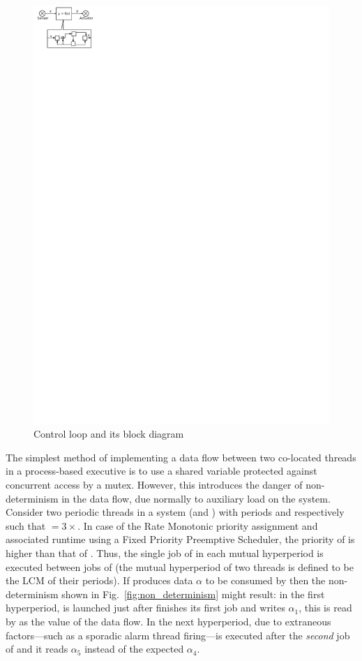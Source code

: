 \begin{figure}
\centering
\includegraphics[scale=1.4]{figs/impulse}
\caption{Control loop and its block diagram}
\label{fig:ctrl_loop}
\end{figure}

The simplest method of implementing a data flow between two co-located
threads in a process-based executive is to use a shared variable
protected against concurrent access by a mutex. However, this
introduces the danger of non-determinism in the data flow, due
normally to auxiliary load on the system. Consider two periodic
threads in a system (\ts and \tl) with periods \pshort and \plong
respectively such that \plong$=3\times$\pshort. In case of the Rate
Monotonic priority assignment and associated runtime using a Fixed
Priority Preemptive Scheduler, the priority of \ts is higher than that
of \tl. Thus, the single job of \tl in each mutual hyperperiod is
executed between jobs of \ts (the mutual hyperperiod of two threads is
defined to be the LCM of their periods). If \ts produces data $\alpha$
to be consumed by \tl then the non-determinism shown in
Fig.~\ref{fig:non_determinism} might result: in the first hyperperiod,
\tl is launched just after \ts finishes its first job and writes
$\alpha_1$, this is read by \tl as the value of the data flow. In the
next hyperperiod, due to extraneous factors---such as a sporadic alarm
thread firing---\tl is executed after the \emph{second} job of \ts and
it reads $\alpha_5$ instead of the expected $\alpha_4$.

